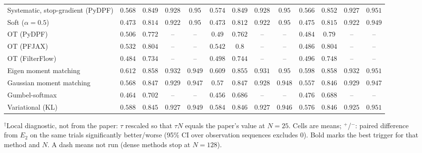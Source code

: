 \begin{table}[ht]
\begin{adjustbox}{max width=\linewidth}
\begin{tabular}{lcccc|cccc|cccc}
Systematic, stop-gradient (PyDPF) & $0.568$ & $0.849$ & $0.928$ & $\mathbf{0.95}$ & $\mathbf{0.574}$ & $0.849$ & $\mathbf{0.928}$ & $0.95$ & $0.566$ & $\mathbf{0.852}$ & $0.927$ & $0.951$ \\
Soft ($\alpha{=}0.5$) & $0.473$ & $0.814$ & $0.922$ & $\mathbf{0.95}$ & $0.473$ & $0.812$ & $\mathbf{0.922}$ & $0.95$ & $\mathbf{0.475}$ & $\mathbf{0.815}$ & $\mathbf{0.922}$ & $0.949$ \\
OT (PyDPF) & $\mathbf{0.506}$ & $0.772$ & -- & -- & $0.49$ & $0.762$ & -- & -- & $0.484$ & $\mathbf{0.79}$ & -- & -- \\
OT (PFJAX) & $0.532$ & $\mathbf{0.804}$ & -- & -- & $\mathbf{0.542}$ & $0.8$ & -- & -- & $0.486$ & $\mathbf{0.804}$ & -- & -- \\
OT (FilterFlow) & $0.484$ & $0.734$ & -- & -- & $\mathbf{0.498}$ & $0.744$ & -- & -- & $0.496$ & $\mathbf{0.748}$ & -- & -- \\
Eigen moment matching & $\mathbf{0.612}$ & $\mathbf{0.858}$ & $\mathbf{0.932}$ & $0.949$ & $0.609$ & $0.855$ & $0.931$ & $\mathbf{0.95}$ & $0.598$ & $\mathbf{0.858}$ & $0.932$ & $0.951$ \\
Gaussian moment matching & $0.568$ & $\mathbf{0.847}$ & $\mathbf{0.929}$ & $0.947$ & $\mathbf{0.57}$ & $0.847$ & $0.928$ & $\mathbf{0.948}$ & $0.557$ & $0.846$ & $0.929$ & $0.947$ \\
Gumbel-softmax & $0.464$ & $\mathbf{0.702}$ & -- & -- & $0.456$ & $0.686$ & -- & -- & $\mathbf{0.476}$ & $0.688$ & -- & -- \\
Variational (KL) & $\mathbf{0.588}$ & $0.845$ & $\mathbf{0.927}$ & $\mathbf{0.949}$ & $0.584$ & $\mathbf{0.846}$ & $0.927$ & $0.946$ & $0.576$ & $0.846$ & $0.925$ & $\mathbf{0.951}$ \\
\bottomrule
\end{tabular}
\end{adjustbox}
\par\smallskip\parbox{0.95\linewidth}{\footnotesize $^\dagger$Local diagnostic, not from the paper: $\tau$ rescaled so that $\tau N$ equals the paper's value at $N{=}25$. Cells are means; $^{+}$/$^{-}$: paired difference from $E_2$ on the same trials significantly better/worse (95\% CI over observation sequences excludes 0). Bold marks the best trigger for that method and $N$. A dash means not run (dense methods stop at $N{=}128$).}
\end{table}

